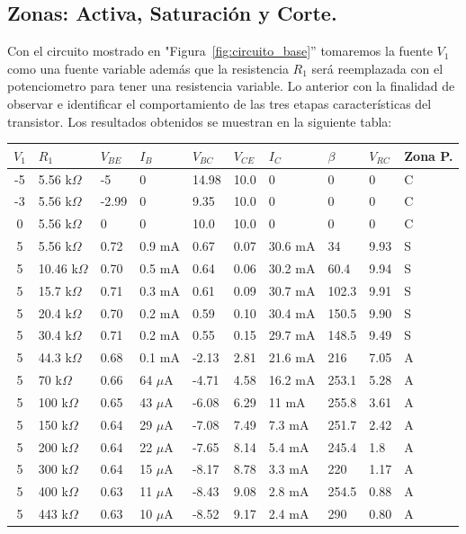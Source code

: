 \documentclass[journal]{IEEEtran}
\begin{document}
    \subsection{Zonas: Activa, Saturación y Corte.}
        Con el circuito mostrado en "Figura~\ref{fig:circuito_base}” tomaremos la fuente $V_1$ como una fuente variable además que la resistencia $R_1$ será reemplazada con el potenciometro para tener una resistencia variable.
        Lo anterior con la finalidad de observar e identificar el comportamiento de las tres etapas características del transistor.
        Los resultados obtenidos se muestran en la siguiente tabla:
        \begin{table}[H]
            \centering
            \small 
            \begin{tabularx}{\columnwidth}{|c|X|X|X|X|X|X|X|X|X|}
            \hline
            \textbf{$V_1$} & \textbf{$R_1$} & \textbf{$V_{BE}$} & \textbf{$I_B$} & \textbf{$V_{BC}$} & \textbf{$V_{CE}$} & \textbf{$I_C$} & \textbf{$\beta$} & \textbf{$V_{RC}$} & \textbf{Zona P.}\\ \hline
            -5 & 5.56 k$\Omega$ & -5 & 0 & 14.98 & 10.0 & 0 & 0 & 0 & C \\ \hline
            -3 & 5.56 k$\Omega$ & -2.99 & 0 & 9.35 & 10.0 & 0 & 0 & 0 & C \\ \hline
            0 & 5.56 k$\Omega$ & 0 & 0 & 10.0 & 10.0 & 0 & 0 & 0 & C \\ \hline
            5 & 5.56 k$\Omega$ & 0.72 & 0.9 mA & 0.67 & 0.07 & 30.6 mA & 34 & 9.93 & S \\ \hline
            5 & 10.46 k$\Omega$ & 0.70 & 0.5 mA & 0.64 & 0.06 & 30.2 mA & 60.4 & 9.94 & S \\ \hline
            5 & 15.7 k$\Omega$ & 0.71 & 0.3 mA & 0.61 & 0.09 & 30.7 mA & 102.3 & 9.91 & S \\ \hline
            5 & 20.4 k$\Omega$ & 0.70 & 0.2 mA & 0.59 & 0.10 & 30.4 mA & 150.5 & 9.90 & S \\ \hline
            5 & 30.4 k$\Omega$ & 0.71 & 0.2 mA & 0.55 & 0.15 & 29.7 mA & 148.5 & 9.49 & S \\ \hline
            5 & 44.3 k$\Omega$ & 0.68 & 0.1 mA & -2.13 & 2.81 & 21.6 mA & 216 & 7.05 & A \\ \hline
            5 & 70 k$\Omega$ & 0.66 & 64 $\mu$A & -4.71 & 4.58 & 16.2 mA & 253.1 & 5.28 & A \\ \hline
            5 & 100 k$\Omega$ & 0.65 & 43 $\mu$A & -6.08 & 6.29 & 11 mA & 255.8 & 3.61 & A \\ \hline
            5 & 150 k$\Omega$ & 0.64 & 29 $\mu$A & -7.08 & 7.49 & 7.3 mA & 251.7 & 2.42 & A \\ \hline
            5 & 200 k$\Omega$ & 0.64 & 22 $\mu$A & -7.65 & 8.14 & 5.4 mA & 245.4 & 1.8 & A \\ \hline
            5 & 300 k$\Omega$ & 0.64 & 15 $\mu$A & -8.17 & 8.78 & 3.3 mA & 220 & 1.17 & A \\ \hline
            5 & 400 k$\Omega$ & 0.63 & 11 $\mu$A & -8.43 & 9.08 & 2.8 mA & 254.5 & 0.88 & A \\ \hline
            5 & 443 k$\Omega$ & 0.63 & 10 $\mu$A & -8.52 & 9.17 & 2.4 mA & 290 & 0.80 & A \\ \hline


\end{tabularx}
\end{table}
\end{document}

